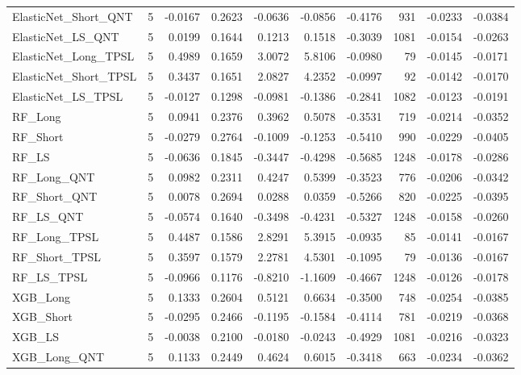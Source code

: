\begin{tabular}{llrrrrrrrr}
\cline{1-10}
ElasticNet\_Short\_QNT & 5 & -0.0167 & 0.2623 & -0.0636 & -0.0856 & -0.4176 & 931 & -0.0233 & -0.0384 \\
\cline{1-10}
ElasticNet\_LS\_QNT & 5 & 0.0199 & 0.1644 & 0.1213 & 0.1518 & -0.3039 & 1081 & -0.0154 & -0.0263 \\
\cline{1-10}
ElasticNet\_Long\_TPSL & 5 & 0.4989 & 0.1659 & 3.0072 & 5.8106 & -0.0980 & 79 & -0.0145 & -0.0171 \\
\cline{1-10}
ElasticNet\_Short\_TPSL & 5 & 0.3437 & 0.1651 & 2.0827 & 4.2352 & -0.0997 & 92 & -0.0142 & -0.0170 \\
\cline{1-10}
ElasticNet\_LS\_TPSL & 5 & -0.0127 & 0.1298 & -0.0981 & -0.1386 & -0.2841 & 1082 & -0.0123 & -0.0191 \\
\cline{1-10}
RF\_Long & 5 & 0.0941 & 0.2376 & 0.3962 & 0.5078 & -0.3531 & 719 & -0.0214 & -0.0352 \\
\cline{1-10}
RF\_Short & 5 & -0.0279 & 0.2764 & -0.1009 & -0.1253 & -0.5410 & 990 & -0.0229 & -0.0405 \\
\cline{1-10}
RF\_LS & 5 & -0.0636 & 0.1845 & -0.3447 & -0.4298 & -0.5685 & 1248 & -0.0178 & -0.0286 \\
\cline{1-10}
RF\_Long\_QNT & 5 & 0.0982 & 0.2311 & 0.4247 & 0.5399 & -0.3523 & 776 & -0.0206 & -0.0342 \\
\cline{1-10}
RF\_Short\_QNT & 5 & 0.0078 & 0.2694 & 0.0288 & 0.0359 & -0.5266 & 820 & -0.0225 & -0.0395 \\
\cline{1-10}
RF\_LS\_QNT & 5 & -0.0574 & 0.1640 & -0.3498 & -0.4231 & -0.5327 & 1248 & -0.0158 & -0.0260 \\
\cline{1-10}
RF\_Long\_TPSL & 5 & 0.4487 & 0.1586 & 2.8291 & 5.3915 & -0.0935 & 85 & -0.0141 & -0.0167 \\
\cline{1-10}
RF\_Short\_TPSL & 5 & 0.3597 & 0.1579 & 2.2781 & 4.5301 & -0.1095 & 79 & -0.0136 & -0.0167 \\
\cline{1-10}
RF\_LS\_TPSL & 5 & -0.0966 & 0.1176 & -0.8210 & -1.1609 & -0.4667 & 1248 & -0.0126 & -0.0178 \\
\cline{1-10}
XGB\_Long & 5 & 0.1333 & 0.2604 & 0.5121 & 0.6634 & -0.3500 & 748 & -0.0254 & -0.0385 \\
\cline{1-10}
XGB\_Short & 5 & -0.0295 & 0.2466 & -0.1195 & -0.1584 & -0.4114 & 781 & -0.0219 & -0.0368 \\
\cline{1-10}
XGB\_LS & 5 & -0.0038 & 0.2100 & -0.0180 & -0.0243 & -0.4929 & 1081 & -0.0216 & -0.0323 \\
\cline{1-10}
XGB\_Long\_QNT & 5 & 0.1133 & 0.2449 & 0.4624 & 0.6015 & -0.3418 & 663 & -0.0234 & -0.0362 \\

\end{tabular}
